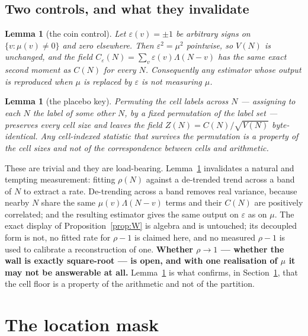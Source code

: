 \documentclass[11pt,a4paper]{article}
\theoremstyle{plain}
\newtheorem{lemma}[theorem]{Lemma}
\theoremstyle{definition}
\begin{document}
\subsection{Two controls, and what they invalidate}

\begin{lemma}[the coin control]\label{lem:coin}
Let $\varepsilon(v)=\pm1$ be arbitrary signs on $\{v : \mu(v)\neq0\}$
and zero elsewhere. Then $\varepsilon^2 = \mu^2$ pointwise, so
$V(N)$ is unchanged, and the field
$C_\varepsilon(N)=\sum_v\varepsilon(v)\Lambda(N-v)$ has the same exact
second moment as $C(N)$ for every $N$. Consequently any estimator whose
output is reproduced when $\mu$ is replaced by $\varepsilon$ is not
measuring $\mu$.
\end{lemma}

\begin{lemma}[the placebo key]\label{lem:placebo}
Permuting the cell labels across $N$ --- assigning to each $N$ the
label of some other $N$, by a fixed permutation of the label set ---
preserves every cell size and leaves the field $Z(N)=C(N)/\sqrt{V(N)}$
byte-identical. Any cell-indexed statistic that survives the
permutation is a property of the cell sizes and not of the
correspondence between cells and arithmetic.
\end{lemma}

These are trivial and they are load-bearing. Lemma~\ref{lem:coin}
invalidates a natural and tempting measurement: fitting $\rho(N)$
against a de-trended trend across a band of $N$ to extract a rate.
De-trending across a band removes real variance, because nearby $N$
share the same $\mu(v)\Lambda(N-v)$ terms and their $C(N)$ are
positively correlated; and the resulting estimator gives the same
output on $\varepsilon$ as on $\mu$. The exact display of
Proposition~\ref{prop:W} is algebra and is untouched; its decoupled
form is not, no fitted rate for $\rho-1$ is claimed here, and no
measured $\rho-1$ is used to calibrate a reconstruction of one.
\textbf{Whether $\rho\to1$ --- whether the
wall is exactly
square-root --- is open, and with one realisation of $\mu$ it may not
be answerable at all.} Lemma~\ref{lem:placebo} is what confirms, in
Section~\ref{sec:floor}, that the cell floor is a property of the
arithmetic and not of the partition.

\section{The location mask}\label{sec:floor}
\end{document}
